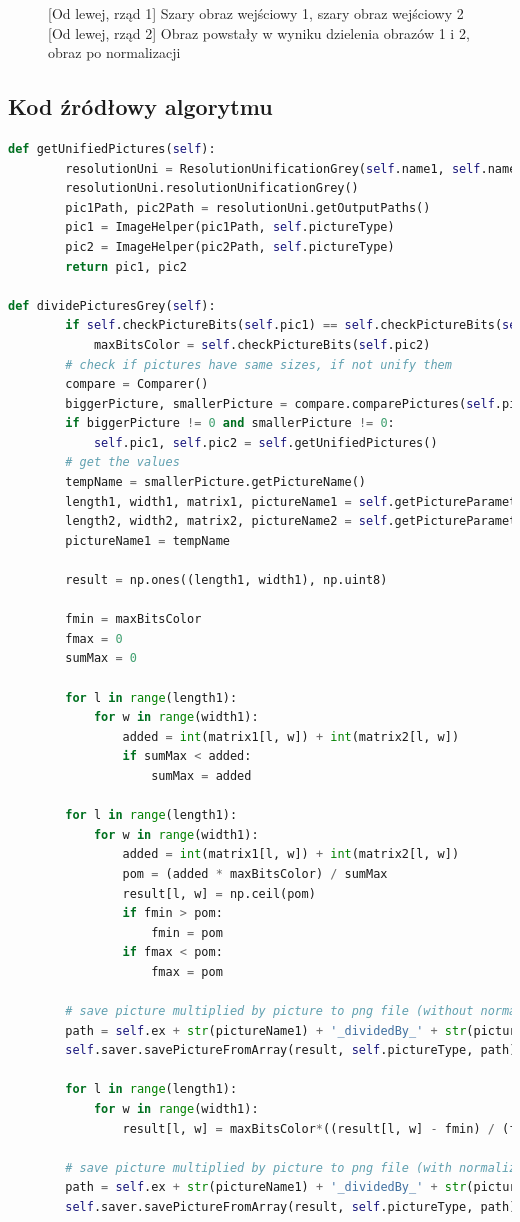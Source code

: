 \documentclass[a4paper,12pt, titlepage]{report}
\begin{document}
\begin{figure}[h]
    \caption{[Od lewej, rząd 1] Szary obraz wejściowy 1, szary obraz wejściowy 2 [Od lewej, rząd 2] Obraz powstały w wyniku dzielenia obrazów 1 i 2, obraz po normalizacji}%
    \label{fig:rysunek}%
\end{figure}
\FloatBarrier
\subsection*{Kod źródłowy algorytmu}
\begin{lstlisting}[language=Python]
def getUnifiedPictures(self):
        resolutionUni = ResolutionUnificationGrey(self.name1, self.name2)
        resolutionUni.resolutionUnificationGrey()
        pic1Path, pic2Path = resolutionUni.getOutputPaths()
        pic1 = ImageHelper(pic1Path, self.pictureType)
        pic2 = ImageHelper(pic2Path, self.pictureType)
        return pic1, pic2

def dividePicturesGrey(self):
        if self.checkPictureBits(self.pic1) == self.checkPictureBits(self.pic2):
            maxBitsColor = self.checkPictureBits(self.pic2)
        # check if pictures have same sizes, if not unify them
        compare = Comparer()
        biggerPicture, smallerPicture = compare.comparePictures(self.pic1, self.pic2)
        if biggerPicture != 0 and smallerPicture != 0:
            self.pic1, self.pic2 = self.getUnifiedPictures()
        # get the values
        tempName = smallerPicture.getPictureName()
        length1, width1, matrix1, pictureName1 = self.getPictureParameters(self.pic1)
        length2, width2, matrix2, pictureName2 = self.getPictureParameters(self.pic2)
        pictureName1 = tempName

        result = np.ones((length1, width1), np.uint8)

        fmin = maxBitsColor
        fmax = 0
        sumMax = 0

        for l in range(length1):
            for w in range(width1):
                added = int(matrix1[l, w]) + int(matrix2[l, w])
                if sumMax < added:
                    sumMax = added

        for l in range(length1):
            for w in range(width1):
                added = int(matrix1[l, w]) + int(matrix2[l, w])
                pom = (added * maxBitsColor) / sumMax
                result[l, w] = np.ceil(pom)
                if fmin > pom:
                    fmin = pom
                if fmax < pom:
                    fmax = pom

        # save picture multiplied by picture to png file (without normalization)
        path = self.ex + str(pictureName1) + '_dividedBy_' + str(pictureName2) + '.png'
        self.saver.savePictureFromArray(result, self.pictureType, path)

        for l in range(length1):
            for w in range(width1):
                result[l, w] = maxBitsColor*((result[l, w] - fmin) / (fmax - fmin))

        # save picture multiplied by picture to png file (with normalization)
        path = self.ex + str(pictureName1) + '_dividedBy_' + str(pictureName2) + '_normalized.png'
        self.saver.savePictureFromArray(result, self.pictureType, path)
\end{lstlisting}
\end{document}
